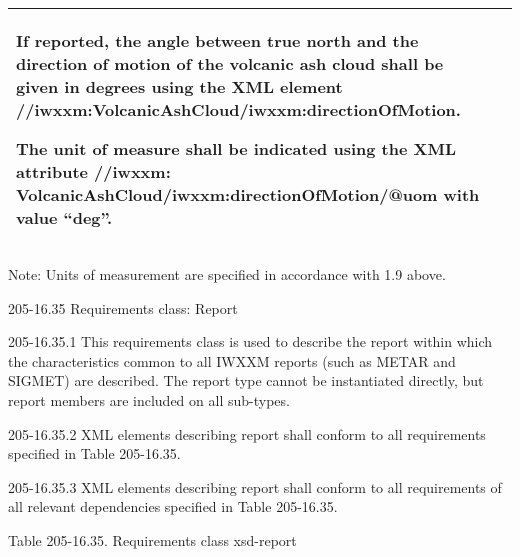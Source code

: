 \begin{longtable}[]{@{}ll@{}}
\begin{minipage}[t]{0.47\columnwidth}
If reported, the angle between true north and the direction of motion of the volcanic ash cloud shall be given in degrees using the XML element //iwxxm:VolcanicAshCloud/iwxxm:directionOfMotion.

The unit of measure shall be indicated using the XML attribute //iwxxm: VolcanicAshCloud/iwxxm:directionOfMotion/@uom with value ``deg''.\strut
\end{minipage}\tabularnewline
\bottomrule
\end{longtable}

Note: Units of measurement are specified in accordance with 1.9 above.

205-16.35 Requirements class: Report

205-16.35.1 This requirements class is used to describe the report within which the characteristics common to all IWXXM reports (such as METAR and SIGMET) are described. The report type cannot be instantiated directly, but report members are included on all sub-types.

205-16.35.2 XML elements describing report shall conform to all requirements specified in Table 205-16.35.

205-16.35.3 XML elements describing report shall conform to all requirements of all relevant dependencies specified in Table 205-16.35.

Table 205-16.35. Requirements class xsd-report


